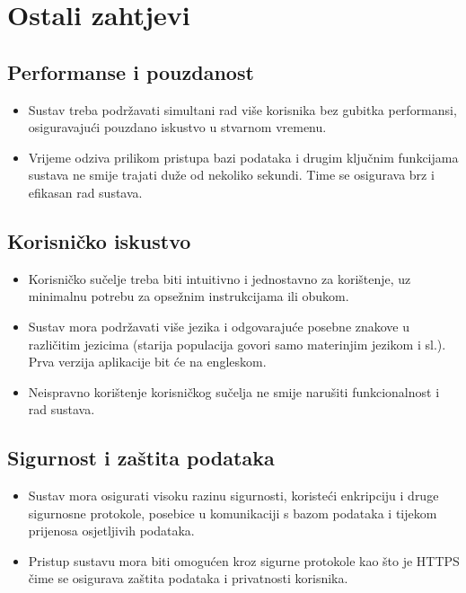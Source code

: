 \section{Ostali zahtjevi}



\subsection*{Performanse i pouzdanost}
\begin{itemize}
    \item Sustav treba podržavati simultani rad više korisnika bez gubitka performansi, osiguravajući pouzdano iskustvo u stvarnom vremenu.
    \item Vrijeme odziva prilikom pristupa bazi podataka i drugim ključnim funkcijama sustava ne smije trajati duže od nekoliko sekundi. Time se osigurava brz i efikasan rad sustava.
\end{itemize}

\subsection*{Korisničko iskustvo}
\begin{itemize}
    \item Korisničko sučelje treba biti intuitivno i jednostavno za korištenje, uz minimalnu potrebu za opsežnim instrukcijama ili obukom.
    \item Sustav mora podržavati više jezika i odgovarajuće posebne znakove u različitim jezicima (starija populacija govori samo materinjim jezikom i sl.). Prva verzija aplikacije bit će na engleskom. 
    \item Neispravno korištenje korisničkog sučelja ne smije narušiti funkcionalnost i rad sustava.
\end{itemize}

\subsection*{Sigurnost i zaštita podataka}
\begin{itemize}
    \item Sustav mora osigurati visoku razinu sigurnosti, koristeći enkripciju i druge sigurnosne protokole, posebice u komunikaciji s bazom podataka i tijekom prijenosa osjetljivih podataka.
    \item Pristup sustavu mora biti omogućen kroz sigurne protokole kao što je HTTPS čime se osigurava zaštita podataka i privatnosti korisnika.
\end{itemize}

